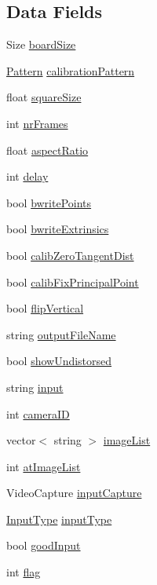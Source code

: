 \subsection*{Data Fields}
\begin{DoxyCompactItemize}
\item 
Size \hyperlink{classSettings_a5030a7164df923bb3b86dd7a0fc9af30}{board\-Size}
\item 
\hyperlink{classSettings_a0e7117abd9427a6f8bc1d1d8d456b5c8}{Pattern} \hyperlink{classSettings_a94551b7ffe8ac60311b035b2905e9498}{calibration\-Pattern}
\item 
float \hyperlink{classSettings_a6c94708776ad1ce258fc44f2101f5941}{square\-Size}
\item 
int \hyperlink{classSettings_a7e6654cd0e51791ed687eaa85f8fc143}{nr\-Frames}
\item 
float \hyperlink{classSettings_af55c910308a0d773055d0b19261bb3b8}{aspect\-Ratio}
\item 
int \hyperlink{classSettings_a5fe947366441009187d633f9e4663256}{delay}
\item 
bool \hyperlink{classSettings_ab4aac97bdb5696d60b35a29c26497064}{bwrite\-Points}
\item 
bool \hyperlink{classSettings_af1ac412d660e25aea698c76fa88de57c}{bwrite\-Extrinsics}
\item 
bool \hyperlink{classSettings_a4bc7ff147d74721a3587ce6fcb64ef32}{calib\-Zero\-Tangent\-Dist}
\item 
bool \hyperlink{classSettings_a44397eea3f08a0c78808c38bdd716594}{calib\-Fix\-Principal\-Point}
\item 
bool \hyperlink{classSettings_ab6304f260b315d2820f755e1c3a052b5}{flip\-Vertical}
\item 
string \hyperlink{classSettings_a9468f1ad53e982f9541d76c8d3228900}{output\-File\-Name}
\item 
bool \hyperlink{classSettings_a935d6f27ee454e9fee63f8b662f48a06}{show\-Undistorsed}
\item 
string \hyperlink{classSettings_a9970d51ab47b6560ab11b267637b6219}{input}
\item 
int \hyperlink{classSettings_af32a5ff06192bde106c934e0361bcd7e}{camera\-I\-D}
\item 
vector$<$ string $>$ \hyperlink{classSettings_ae261128a69d1d3d2b0f5315aff8066c8}{image\-List}
\item 
int \hyperlink{classSettings_a80061aedf354e63cb6c4c1fb7c4a9055}{at\-Image\-List}
\item 
Video\-Capture \hyperlink{classSettings_abd5706146b34d3c32aef4025dcd2ec1b}{input\-Capture}
\item 
\hyperlink{classSettings_a5afe85d24b071973a7f248c05386f7f4}{Input\-Type} \hyperlink{classSettings_a89fb14ce9856fb642f18bb0f7c5b8868}{input\-Type}
\item 
bool \hyperlink{classSettings_a3b9fc27b555f982bd5b9ea5198e1f7e3}{good\-Input}
\item 
int \hyperlink{classSettings_aba5691e3e76525f93ea254e654ec3717}{flag}
\end{DoxyCompactItemize}


